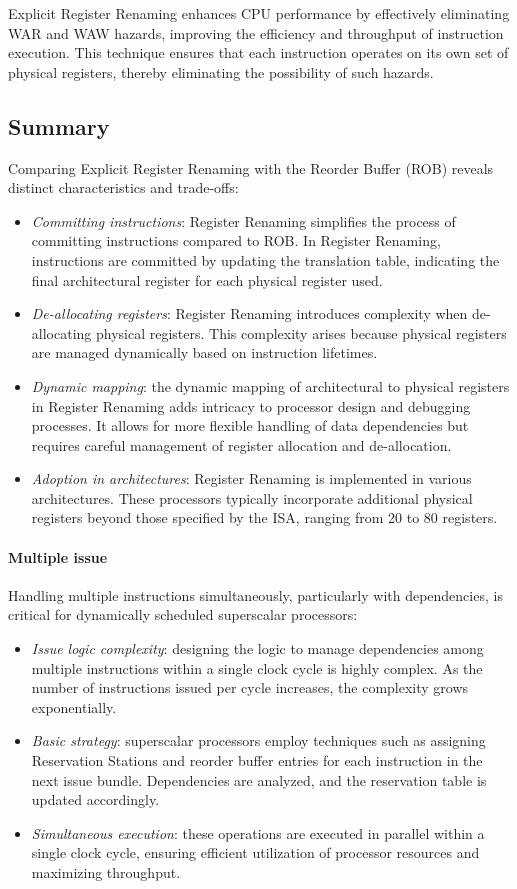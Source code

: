 Explicit Register Renaming enhances CPU performance by effectively eliminating WAR and WAW hazards, improving the efficiency and throughput of instruction execution.
This technique ensures that each instruction operates on its own set of physical registers, thereby eliminating the possibility of such hazards.

\subsection{Summary}
Comparing Explicit Register Renaming with the Reorder Buffer (ROB) reveals distinct characteristics and trade-offs:
\begin{itemize}
    \item \textit{Committing instructions}: Register Renaming simplifies the process of committing instructions compared to ROB. 
        In Register Renaming, instructions are committed by updating the translation table, indicating the final architectural register for each physical register used.
    \item \textit{De-allocating registers}: Register Renaming introduces complexity when de-allocating physical registers. 
        This complexity arises because physical registers are managed dynamically based on instruction lifetimes.
    \item \textit{Dynamic mapping}: the dynamic mapping of architectural to physical registers in Register Renaming adds intricacy to processor design and debugging processes. 
        It allows for more flexible handling of data dependencies but requires careful management of register allocation and de-allocation.
    \item \textit{Adoption in architectures}: Register Renaming is implemented in various architectures. 
        These processors typically incorporate additional physical registers beyond those specified by the ISA, ranging from 20 to 80 registers.
\end{itemize}

\paragraph*{Multiple issue}
Handling multiple instructions simultaneously, particularly with dependencies, is critical for dynamically scheduled superscalar processors:
\begin{itemize}
    \item \textit{Issue logic complexity}: designing the logic to manage dependencies among multiple instructions within a single clock cycle is highly complex. 
        As the number of instructions issued per cycle increases, the complexity grows exponentially.
    \item \textit{Basic strategy}: superscalar processors employ techniques such as assigning Reservation Stations and reorder buffer entries for each instruction in the next issue bundle. 
        Dependencies are analyzed, and the reservation table is updated accordingly.
    \item \textit{Simultaneous execution}: these operations are executed in parallel within a single clock cycle, ensuring efficient utilization of processor resources and maximizing throughput.
\end{itemize}

